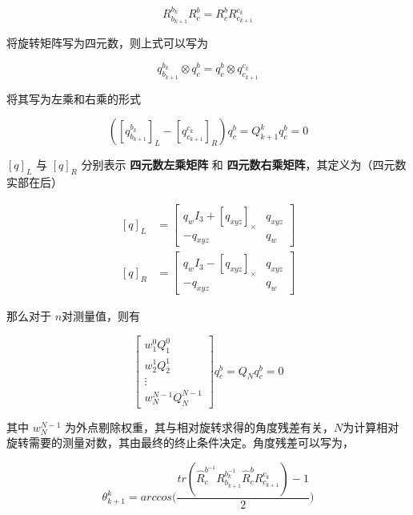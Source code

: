 \documentclass[12pt,a4paper]{article}
\begin{document}
\begin{equation}
R^{b_{k}}_{b_{k+1}}R^{b}_{c}=R^{b}_{c}R^{c_{k}}_{c_{k+1}}
\end{equation}

将旋转矩阵写为四元数，则上式可以写为

\begin{equation}
q^{b_{k}}_{b_{k+1}} \otimes q^{b}_{c}=q^{b}_{c}\otimes q^{c_{k}}_{c_{k+1}}
\end{equation}

将其写为左乘和右乘的形式

\begin{equation}
({[q^{b_{k}}_{b_{k+1}}]}_L - {[q^{c_{k}}_{c_{k+1}}]}_R) q^b_c
= Q^k_{k+1} q^b_c = 0
\end{equation}

$[q]_L$ 与 $[q]_R$ 分别表示 \textbf{四元数左乘矩阵} 和 \textbf{四元数右乘矩阵}，其定义为（四元数实部在后）

\begin{equation}
\begin{aligned}
[q]_L &=
\begin{bmatrix}
q_{w}I_{3}+[q_{xyz }]_{\times} & q_{xyz}\\
-q_{xyz} & q_{w}
\end{bmatrix} \\
[q]_R &=
\begin{bmatrix}
q_{w}I_{3}-[q_{xyz }]_{\times} & q_{xyz}\\
-q_{xyz} & q_{w}
\end{bmatrix}
\end{aligned}
\end{equation}

那么对于 $n$对测量值，则有

\begin{equation}
\begin{bmatrix}
w^{0}_{1}Q^{0}_{1}\\
w^{1}_{2}Q^{1}_{2}\\
\vdots \\
w^{N-1}_{N}Q^{N-1}_{N}
\end{bmatrix}q^{b}_{c}=Q_{N}q^{b}_{c}=0
\end{equation}

其中 $w^{N-1}_{N}$ 为外点剔除权重，其与相对旋转求得的角度残差有关，$N$为计算相对旋转需要的测量对数，其由最终的终止条件决定。角度残差可以写为，

\begin{equation}
{\theta}^{k}_{k+1}=
arccos\bigg(
  \frac{tr(\hat{R}^{b^{-1}}_{c}R^{b_{k}^{-1}}_{b_{k+1}}\hat{R}^{b}_{c}R^{c_{k}}_{c_{k+1}} )-1}{2}\bigg)
\end{equation}
\end{document}
